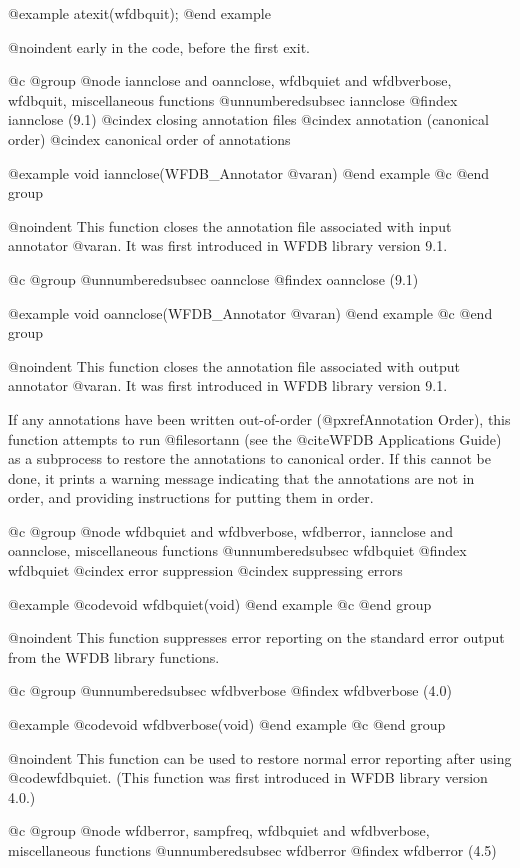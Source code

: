 {{{{{{{{{@example
	atexit(wfdbquit);
@end example

@noindent
early in the code, before the first exit.


@c @group
@node     iannclose and oannclose, wfdbquiet and wfdbverbose, wfdbquit, miscellaneous functions
@unnumberedsubsec iannclose
@findex iannclose (9.1)
@cindex closing annotation files
@cindex annotation (canonical order)
@cindex canonical order of annotations

@example
void iannclose(WFDB_Annotator @var{an})
@end example
@c @end group

@noindent
This function closes the annotation file associated with input annotator
@var{an}.  It was first introduced in WFDB library version 9.1.

@c @group
@unnumberedsubsec oannclose
@findex oannclose (9.1)

@example
void oannclose(WFDB_Annotator @var{an})
@end example
@c @end group

@noindent
This function closes the annotation file associated with output
annotator @var{an}.  It was first introduced in WFDB library version 9.1.

If any annotations have been written out-of-order (@pxref{Annotation Order}),
this function attempts to run @file{sortann} (see the @cite{WFDB
Applications Guide}) as a subprocess to restore the annotations to canonical
order.  If this cannot be done, it prints a warning message indicating that the
annotations are not in order, and providing instructions for putting them in
order.

@c @group
@node     wfdbquiet and wfdbverbose, wfdberror, iannclose and oannclose, miscellaneous functions
@unnumberedsubsec wfdbquiet
@findex wfdbquiet
@cindex error suppression
@cindex suppressing errors

@example
@code{void wfdbquiet(void)}
@end example
@c @end group

@noindent
This function suppresses error reporting on the standard error output
from the WFDB library functions.

@c @group
@unnumberedsubsec wfdbverbose
@findex wfdbverbose (4.0)

@example
@code{void wfdbverbose(void)}
@end example
@c @end group

@noindent
This function can be used to restore normal error reporting after using
@code{wfdbquiet}.  (This function was first introduced in WFDB library
version 4.0.)

@c @group
@node     wfdberror, sampfreq, wfdbquiet and wfdbverbose, miscellaneous functions
@unnumberedsubsec wfdberror
@findex wfdberror (4.5)

}}}}}}}}}
